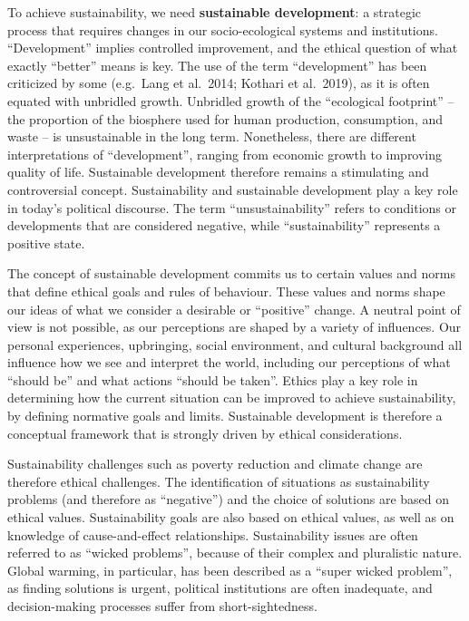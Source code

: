 \documentclass[
  a4paper,
  openany]{book}
\begin{document}
To achieve sustainability, we need \textbf{sustainable development}: a
strategic process that requires changes in our socio-ecological systems
and institutions. ``Development'' implies controlled improvement, and
the ethical question of what exactly ``better'' means is key. The use of
the term ``development'' has been criticized by some (e.g.~Lang et
al.~2014; Kothari et al.~2019), as it is often equated with unbridled
growth. Unbridled growth of the ``ecological footprint'' -- the
proportion of the biosphere used for human production, consumption, and
waste -- is unsustainable in the long term. Nonetheless, there are
different interpretations of ``development'', ranging from economic
growth to improving quality of life. Sustainable development therefore
remains a stimulating and controversial concept. Sustainability and
sustainable development play a key role in today's political discourse.
The term ``unsustainability'' refers to conditions or developments that
are considered negative, while ``sustainability'' represents a positive
state.

The concept of sustainable development commits us to certain values and
norms that define ethical goals and rules of behaviour. These values and
norms shape our ideas of what we consider a desirable or ``positive''
change. A neutral point of view is not possible, as our perceptions are
shaped by a variety of influences. Our personal experiences, upbringing,
social environment, and cultural background all influence how we see and
interpret the world, including our perceptions of what ``should be'' and
what actions ``should be taken''. Ethics play a key role in determining
how the current situation can be improved to achieve sustainability, by
defining normative goals and limits. Sustainable development is
therefore a conceptual framework that is strongly driven by ethical
considerations.

Sustainability challenges such as poverty reduction and climate change
are therefore ethical challenges. The identification of situations as
sustainability problems (and therefore as ``negative'') and the choice
of solutions are based on ethical values. Sustainability goals are also
based on ethical values, as well as on knowledge of cause-and-effect
relationships. Sustainability issues are often referred to as ``wicked
problems'', because of their complex and pluralistic nature. Global
warming, in particular, has been described as a ``super wicked
problem'', as finding solutions is urgent, political institutions are
often inadequate, and decision-making processes suffer from
short-sightedness.
\end{document}
